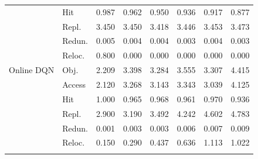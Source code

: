 \begin{table}[t]
\begin{tabular}{llrrrrrr}
 & Hit & 0.987 & 0.962 & 0.950 & 0.936 & 0.917 & 0.877 \\
 & Repl. & 3.450 & 3.450 & 3.418 & 3.446 & 3.453 & 3.473 \\
 & Redun. & 0.005 & 0.004 & 0.004 & 0.003 & 0.004 & 0.003 \\
 & Reloc. & 0.800 & 0.000 & 0.000 & 0.000 & 0.000 & 0.000 \\
\addlinespace[1pt]
Online DQN & Obj. & 2.209 & 3.398 & 3.284 & 3.555 & 3.307 & 4.415 \\
 & Access & 2.120 & 3.268 & 3.143 & 3.343 & 3.039 & 4.125 \\
 & Hit & 1.000 & 0.965 & 0.968 & 0.961 & 0.970 & 0.936 \\
 & Repl. & 2.900 & 3.190 & 3.492 & 4.242 & 4.602 & 4.783 \\
 & Redun. & 0.001 & 0.003 & 0.003 & 0.006 & 0.007 & 0.009 \\
 & Reloc. & 0.150 & 0.290 & 0.437 & 0.636 & 1.113 & 1.022 \\
\addlinespace[1pt]
\bottomrule
\end{tabular}
\end{table}
